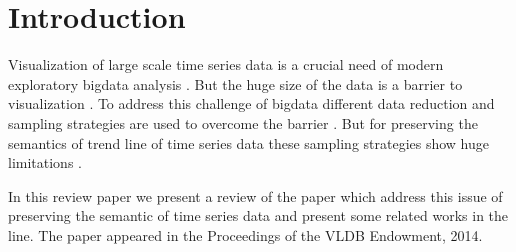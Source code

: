 \section{Introduction} \label{intro}
Visualization of large scale time series data is a crucial need of modern exploratory
bigdata analysis \cite{fu2011review}. But the huge size of the data is a barrier to visualization \cite{labrinidis2012challenges,fan2014challenges,chen2014data}. 
To address this challenge of bigdata different data reduction and sampling strategies are used to overcome the barrier \cite{cormode2014sampling,wu2014data}. But for preserving the 
semantics of trend line of time series data these sampling strategies show huge 
limitations \cite{jugel2014m4}. 

In this review paper we present a review of the paper \cite{jugel2014m4} which address this issue of preserving the semantic of time series data and present some related works in the line.  The paper appeared in the Proceedings of the VLDB Endowment, 2014. 